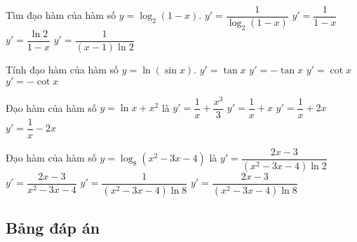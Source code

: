 \begin{ex}%
	Tìm đạo hàm của hàm số $y=\log_2(1-x)$.
	\choice
	{$y'=\dfrac{1}{\log_2(1-x)}$}
	{$y'=\dfrac{1}{1-x}$}
	{$y'=\dfrac{\ln 2}{1-x}$}
	{\True $y'=\dfrac{1}{(x-1)\ln 2}$}
\end{ex}

\begin{ex}%
	Tính đạo hàm của hàm số $y=\ln (\sin x)$.
	\choice
	{$y'=\tan x$}
	{$y'=-\tan x$}
	{\True $y'=\cot x$}
	{$y'=-\cot x$}
\end{ex}

\begin{ex}%
	Đạo hàm của hàm số $y=\ln x+x^2$ là
	\choice
	{$y'=\dfrac{1}{x}+\dfrac{x^3}{3}$}
	{$y'=\dfrac{1}{x}+x$}
	{\True $y'=\dfrac{1}{x}+2x$}
	{$y'=\dfrac{1}{x}-2x$}
\end{ex}

\begin{ex}%
	Đạo hàm của hàm số $y=\log_8\left(x^2-3x-4\right)$ là
	\choice
	{$y'=\dfrac{2x-3}{\left(x^2-3x-4\right)\ln 2}$}
	{$y'=\dfrac{2x-3}{x^2-3x-4}$}
	{$y'=\dfrac{1}{\left(x^2-3x-4\right)\ln 8}$}
	{\True $y'=\dfrac{2x-3}{\left(x^2-3x-4\right)\ln 8}$}
\end{ex}
\subsection{Bảng đáp án}

